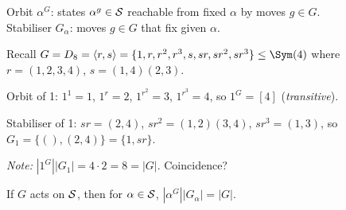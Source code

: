 \begin{slide}
    Orbit $\alpha^G$: states $\alpha^g \in \mathcal{S}$ reachable from fixed $\alpha$ by moves $g \in G$. \\
    Stabiliser $G_\alpha$: moves $g \in G$ that fix given $\alpha$.

    \begin{example}
        \vspace{0pt}
        Recall $G = D_8 = \langle r,s \rangle = \{1,r,r^2,r^3,s,sr,sr^2,sr^3\} \leq \Sym(4)$ where $r = (1,2,3,4)$, $s = (1,4)(2,3)$.

        Orbit of 1: $1^1 = 1$, $1^r = 2$, $1^{r^2} = 3$, $1^{r^3} = 4$, so $1^G = [4]$ (\textit{transitive}). \pause

        Stabiliser of 1: $sr = (2,4)$, $sr^2 = (1,2)(3,4)$, $sr^3 = (1,3)$, so $G_1 = \{(),(2,4)\} = \{1,sr\}$.

        \textit{Note:} $|1^G||G_1| = 4 \cdot 2 = 8 = |G|$. Coincidence?
    \end{example} \pause

    \begin{theorem}
        \vspace{0pt}
        If $G$ acts on $\mathcal{S}$, then for $\alpha \in \mathcal{S}$, $|\alpha^G||G_\alpha| = |G|$.
    \end{theorem}
\end{slide}